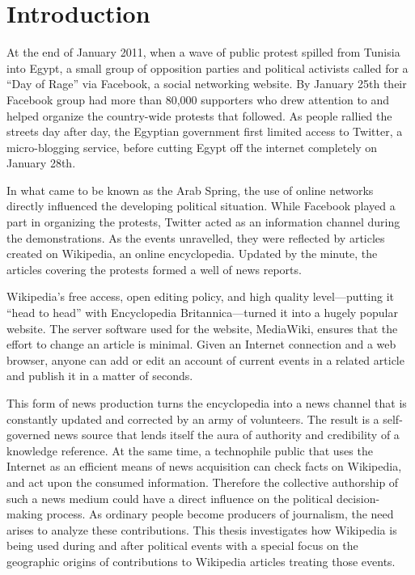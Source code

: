 \chapter{Introduction}\label{ch:introduction}


At the end of January 2011, when a wave of public protest spilled from Tunisia into Egypt, a small group of opposition parties and political activists called for a ``Day of Rage'' via Facebook, a social networking website.
By January 25th their Facebook group had more than 80,000 supporters who drew attention to and helped organize the country-wide protests that followed. 
As people rallied the streets day after day, the Egyptian government first limited access to Twitter, a micro-blogging service, before cutting Egypt off the internet completely on January 28th.\cite{econ18013760, szegypt}

In what came to be known as the Arab Spring, the use of online networks directly influenced the  developing political situation.
While Facebook played a part in organizing the protests, Twitter acted as an information channel during the demonstrations.
As the events unravelled, they were reflected by articles created on Wikipedia, an online encyclopedia.
Updated by the minute, the articles covering the protests formed a well of news reports.\cite{wikiegypt}

Wikipedia's free access, open editing policy, and high quality level---putting it ``head to head''\cite{giles2005internet} with Encyclopedia Britannica---turned it into a hugely popular website\cite{wikipv}.
The server software used for the website, MediaWiki, ensures that the effort to change an article is minimal.
Given an Internet connection and a web browser, anyone can add or edit an account of current events in a related article and publish it in a matter of seconds.

This form of news production turns the encyclopedia into a news channel that is constantly updated and corrected by an army of volunteers.
The result is a self-governed news source that lends itself the aura of authority and credibility of a knowledge reference.
At the same time, a technophile public that uses the Internet as an efficient means of news acquisition can check facts on Wikipedia, and act upon the consumed information.\cite[p. 424--427]{chadwick2009routledge}
Therefore the collective authorship of such a news medium could have a direct influence on the political decision-making process.
As ordinary people become producers of journalism, the need arises to analyze these contributions. 
This thesis investigates  how Wikipedia is being used during and after political events with a special focus on the geographic origins of contributions to Wikipedia articles treating those events.

